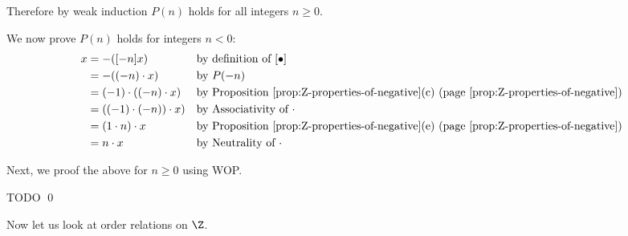 Therefore by weak induction $P(n)$ holds for all integers $n \geq 0$.

We now prove $P(n)$ holds for integers $n < 0$:
\begin{align*}
[n]x &= -([-n]x)        & & \text{by definition of $[ \bullet ]$} \\
     &= -((-n) \cdot x) & & \text{by $P(-n)$} \\
     &= (-1)\cdot ((-n) \cdot x) & & \text{by Proposition \ref{prop:Z-properties-of-negative}(c) (page \pageref{prop:Z-properties-of-negative})} \\
     &= ((-1)\cdot (-n)) \cdot x) & & \text{by Associativity of $\cdot$} \\
     &= (1\cdot n) \cdot x & & \text{\text{by Proposition \ref{prop:Z-properties-of-negative}(e) (page \pageref{prop:Z-properties-of-negative})}} \\
     &= n \cdot x       & & \text{by Neutrality of $\cdot$}
\end{align*}

Next, we proof the above for $n \geq 0$ using WOP.

TODO
\qed

Now let us look at order relations on $\Z$.

